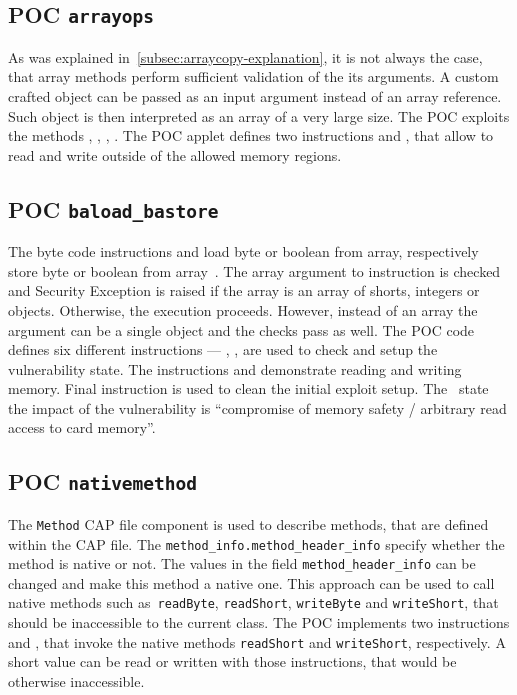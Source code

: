 \subsection{POC \texttt{arrayops}}
As was explained in~\ref{subsec:arraycopy-explanation}, it is not always the case, that array methods perform sufficient validation of the its arguments. A custom crafted object can be passed as an input argument instead of an array reference. Such object is then interpreted as an array of a very large size. The POC \arrayops exploits the methods \arrayFill, \arrayFillNonAtomic, \setShort, \setInt. The POC applet defines two instructions \readmem and \writemem, that allow to read and write outside of the allowed memory regions.

\subsection{POC \texttt{baload_bastore}}
The byte code instructions \baload and \bastore load byte or boolean from array, respectively store byte or boolean from array~\cite{jcspecs31download}. The array argument to \baload instruction is checked and Security Exception is raised if the array is an array of shorts, integers or objects. Otherwise, the execution proceeds. However, instead of an array the argument can be a single object and the checks pass as well. 
The POC code defines six different instructions --- \ping, \status, \setup are used to check and setup the vulnerability state. The instructions \readmem and \writemem demonstrate reading and writing memory. Final instruction \cleanup is used to clean the initial exploit setup. The~\cite{se:oracle:part1} state the impact of the vulnerability is ``compromise of memory safety / arbitrary read access to card memory''.

\subsection{POC \texttt{nativemethod}}
The \texttt{Method} CAP file component is used to describe methods, that are defined within the CAP file. The \texttt{method_info.method_header_info} specify whether the method is native or not. The values in the field \texttt{method_header_info} can be changed and make this method a native one. This approach can be used to call native methods such as~\texttt{readByte}, \texttt{readShort}, \texttt{writeByte} and \texttt{writeShort}, that should be inaccessible to the current class.
The POC implements two instructions \nreadshort and \nwriteshort, that invoke the native methods \texttt{readShort} and \texttt{writeShort}, respectively. A short value can be read or written with those instructions, that would be otherwise inaccessible.


